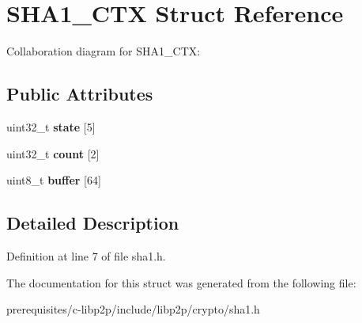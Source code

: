 \hypertarget{struct_s_h_a1___c_t_x}{}\section{S\+H\+A1\+\_\+\+C\+TX Struct Reference}
\label{struct_s_h_a1___c_t_x}


Collaboration diagram for S\+H\+A1\+\_\+\+C\+TX\+:
\subsection*{Public Attributes}
\begin{DoxyCompactItemize}
\item 
\mbox{\label{struct_s_h_a1___c_t_x_a81d7f6018258ee84f001284c6ff9d2d5}} 
uint32\+\_\+t {\bfseries state} \mbox{[}5\mbox{]}
\item 
\mbox{\label{struct_s_h_a1___c_t_x_a7db1dac8c2309a5b22f1cf4bc5de96a5}} 
uint32\+\_\+t {\bfseries count} \mbox{[}2\mbox{]}
\item 
\mbox{\label{struct_s_h_a1___c_t_x_a504b63b136595fca38f2f64d091713d7}} 
uint8\+\_\+t {\bfseries buffer} \mbox{[}64\mbox{]}
\end{DoxyCompactItemize}


\subsection{Detailed Description}


Definition at line 7 of file sha1.\+h.



The documentation for this struct was generated from the following file\+:\begin{DoxyCompactItemize}
\item 
prerequisites/c-\/libp2p/include/libp2p/crypto/sha1.\+h\end{DoxyCompactItemize}
